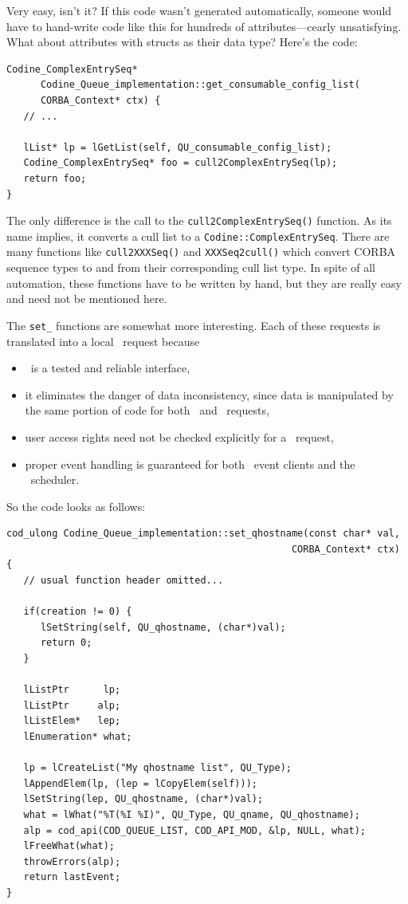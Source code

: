 Very easy, isn't it? If this code wasn't generated automatically, someone
would have to hand-write code like this for hundreds of attributes---cearly
unsatisfying. What about attributes with structs as their data type? Here's
the code:

\begin{Verbatim}[fontsize=\small, frame=single]
Codine_ComplexEntrySeq* 
      Codine_Queue_implementation::get_consumable_config_list(
      CORBA_Context* ctx) {
   // ...

   lList* lp = lGetList(self, QU_consumable_config_list);
   Codine_ComplexEntrySeq* foo = cull2ComplexEntrySeq(lp);
   return foo;
}
\end{Verbatim}

\label{p_converters}
The only difference is the call to the \texttt{cull2ComplexEntrySeq()}
function. As its name implies, it converts a cull list to a
\texttt{Codine::ComplexEntrySeq}. There are many functions like
\texttt{cull2XXXSeq()} and \texttt{XXXSeq2cull()} which convert CORBA
sequence types to and from their corresponding cull list type. In spite of
all automation, these functions have to be written by hand, but they are
really easy and need not be mentioned here.

The \texttt{set\_} functions are somewhat more interesting. Each of these
requests is translated into a local \codapi\ request because
\begin{itemize}
\item \codapi\ is a tested and reliable interface,
\item it eliminates the danger of data inconsistency, since data is manipulated
      by the same portion of code for both \codapi\ and \qidl\ requests,
\item user access rights need not be checked explicitly for a \qidl\ request,
\item proper event handling is guaranteed for both \qidl\ event clients and 
      the \codine\ scheduler.
\end{itemize}
So the code looks as follows:

\begin{Verbatim}[fontsize=\small, frame=single]
cod_ulong Codine_Queue_implementation::set_qhostname(const char* val,
                                                  CORBA_Context* ctx) {
   // usual function header omitted...

   if(creation != 0) {
      lSetString(self, QU_qhostname, (char*)val);
      return 0;
   }

   lListPtr      lp;
   lListPtr     alp;
   lListElem*   lep;
   lEnumeration* what;

   lp = lCreateList("My qhostname list", QU_Type);
   lAppendElem(lp, (lep = lCopyElem(self)));
   lSetString(lep, QU_qhostname, (char*)val);
   what = lWhat("%T(%I %I)", QU_Type, QU_qname, QU_qhostname);
   alp = cod_api(COD_QUEUE_LIST, COD_API_MOD, &lp, NULL, what);
   lFreeWhat(what);
   throwErrors(alp);
   return lastEvent;
}
\end{Verbatim}

